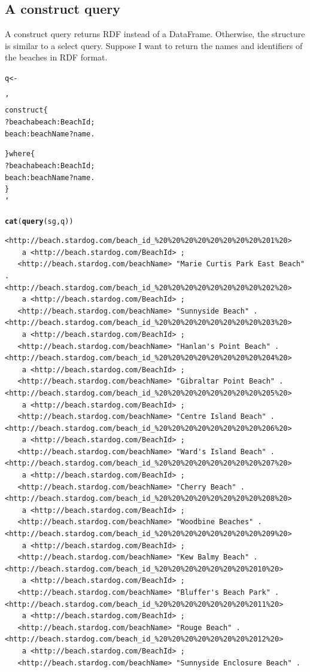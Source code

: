 \documentclass{article}\usepackage[]{graphicx}\usepackage[]{xcolor}
\makeatletter
\newcommand{\hlstr}[1]{\textcolor[rgb]{0.192,0.494,0.8}{#1}}%
\newcommand{\hlstd}[1]{\textcolor[rgb]{0.345,0.345,0.345}{#1}}%
\newcommand{\hlkwb}[1]{\textcolor[rgb]{0.69,0.353,0.396}{#1}}%
\newcommand{\hlkwd}[1]{\textcolor[rgb]{0.737,0.353,0.396}{\textbf{#1}}}%
\newenvironment{kframe}{%
 \def\at@end@of@kframe{}%
 \ifinner\ifhmode%
  \def\at@end@of@kframe{\end{minipage}}%
  \begin{minipage}{\columnwidth}%
 \fi\fi%
 \def\FrameCommand##1{\hskip\@totalleftmargin \hskip-\fboxsep
 \colorbox{shadecolor}{##1}\hskip-\fboxsep
     \hskip-\linewidth \hskip-\@totalleftmargin \hskip\columnwidth}%
 \MakeFramed {\advance\hsize-\width
   \@totalleftmargin\z@ \linewidth\hsize
   \@setminipage}}%
 {\par\unskip\endMakeFramed%
 \at@end@of@kframe}
\newenvironment{knitrout}{}{} %
\makeatother
\begin{document}
\subsection{A construct query}

A construct query returns RDF instead of a DataFrame. Otherwise, the structure is similar to a select query. Suppose I want to return the names and identifiers of the beaches in RDF format.

\begin{knitrout}
\color{fgcolor}\begin{kframe}
\begin{alltt}
\hlstd{q} \hlkwb{<-} \hlstr{'
construct \{
  ?beach a beach:BeachId ;
    beach:beachName ?name .

\} where \{
  ?beach a beach:BeachId ;
    beach:beachName ?name .
\}
'}

\hlkwd{cat}\hlstd{(}\hlkwd{query}\hlstd{(sg, q))}
\end{alltt}
\end{kframe}
\end{knitrout}

\begin{verbatim}
<http://beach.stardog.com/beach_id_%20%20%20%20%20%20%20%20%201%20>
    a <http://beach.stardog.com/BeachId> ;
   <http://beach.stardog.com/beachName> "Marie Curtis Park East Beach" .
<http://beach.stardog.com/beach_id_%20%20%20%20%20%20%20%20%202%20>
    a <http://beach.stardog.com/BeachId> ;
   <http://beach.stardog.com/beachName> "Sunnyside Beach" .
<http://beach.stardog.com/beach_id_%20%20%20%20%20%20%20%20%203%20>
    a <http://beach.stardog.com/BeachId> ;
   <http://beach.stardog.com/beachName> "Hanlan's Point Beach" .
<http://beach.stardog.com/beach_id_%20%20%20%20%20%20%20%20%204%20>
    a <http://beach.stardog.com/BeachId> ;
   <http://beach.stardog.com/beachName> "Gibraltar Point Beach" .
<http://beach.stardog.com/beach_id_%20%20%20%20%20%20%20%20%205%20>
    a <http://beach.stardog.com/BeachId> ;
   <http://beach.stardog.com/beachName> "Centre Island Beach" .
<http://beach.stardog.com/beach_id_%20%20%20%20%20%20%20%20%206%20>
    a <http://beach.stardog.com/BeachId> ;
   <http://beach.stardog.com/beachName> "Ward's Island Beach" .
<http://beach.stardog.com/beach_id_%20%20%20%20%20%20%20%20%207%20>
    a <http://beach.stardog.com/BeachId> ;
   <http://beach.stardog.com/beachName> "Cherry Beach" .
<http://beach.stardog.com/beach_id_%20%20%20%20%20%20%20%20%208%20>
    a <http://beach.stardog.com/BeachId> ;
   <http://beach.stardog.com/beachName> "Woodbine Beaches" .
<http://beach.stardog.com/beach_id_%20%20%20%20%20%20%20%20%209%20>
    a <http://beach.stardog.com/BeachId> ;
   <http://beach.stardog.com/beachName> "Kew Balmy Beach" .
<http://beach.stardog.com/beach_id_%20%20%20%20%20%20%20%2010%20>
    a <http://beach.stardog.com/BeachId> ;
   <http://beach.stardog.com/beachName> "Bluffer's Beach Park" .
<http://beach.stardog.com/beach_id_%20%20%20%20%20%20%20%2011%20>
    a <http://beach.stardog.com/BeachId> ;
   <http://beach.stardog.com/beachName> "Rouge Beach" .
<http://beach.stardog.com/beach_id_%20%20%20%20%20%20%20%2012%20>
    a <http://beach.stardog.com/BeachId> ;
   <http://beach.stardog.com/beachName> "Sunnyside Enclosure Beach" .
\end{verbatim}
\end{document}
